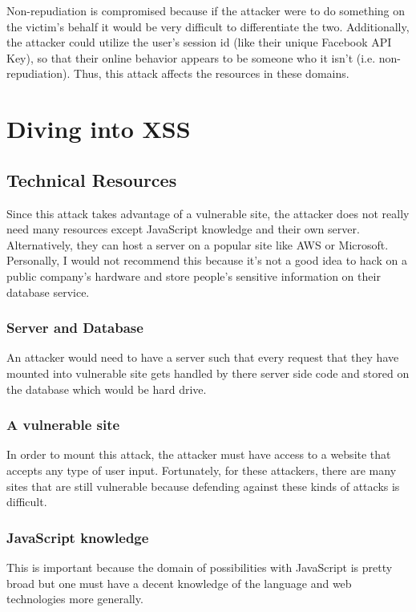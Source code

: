 \documentclass[conference]{IEEEtran}
\begin{document}
Non-repudiation is compromised because if the attacker were to do something on the victim's behalf it would be very difficult to differentiate the two.  Additionally, the attacker could utilize the user’s session id (like their unique Facebook API Key), so that their online behavior appears to be someone who it isn’t (i.e. non-repudiation). Thus, this attack affects the resources in these domains.\\

\section{Diving into XSS}

\subsection{Technical Resources}
Since this attack takes advantage of a vulnerable site, the attacker does not really need many resources except JavaScript knowledge and their own server. Alternatively, they can host a server on a popular site like AWS or Microsoft. Personally, I would not recommend this because it's not a good idea to hack on a public company's hardware and store people's sensitive information on their database service.\\

\subsubsection{Server and Database}
An attacker would need to have a server such that every request that they have mounted into vulnerable site gets handled by there server side code and stored on the database which would be hard drive.\\
\subsubsection{A vulnerable site} In order to mount this attack, the attacker must have access to a website that accepts any type of user input. Fortunately, for these attackers, there are many sites that are still vulnerable because defending against these kinds of attacks is difficult.\\
\subsubsection{JavaScript knowledge}
This is important because the domain of possibilities with JavaScript is pretty broad but one must have a decent knowledge of the language and web technologies more generally.
\end{document}

